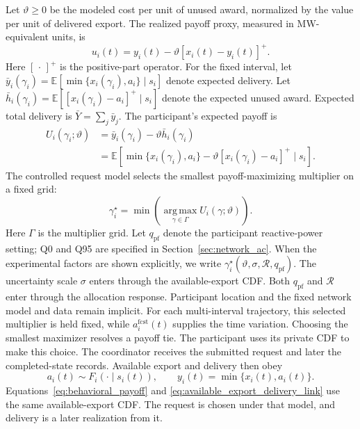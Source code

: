 \documentclass[twoside,twocolumn,9pt]{article}
\begin{document}
{Let $\vartheta\ge0$ be the modeled cost per unit of unused award, normalized by
the value per unit of delivered export. The realized payoff proxy, measured in
MW-equivalent units, is
\begin{equation}
u_i(t)=y_i(t)-\vartheta[x_i(t)-y_i(t)]^+.
\label{eq:realized_private_payoff}
\end{equation}
Here $[\,\cdot\,]^+$ is the positive-part operator. For the fixed interval, let
$\bar y_i(\gamma_i)=\mathbb E[\min\{x_i(\gamma_i),a_i\}\mid s_i]$ denote
expected delivery. Let
$\bar h_i(\gamma_i)=\mathbb E[[x_i(\gamma_i)-a_i]^+\mid s_i]$ denote the expected
unused award. Expected total delivery is $\bar Y=\sum_j\bar y_j$. The
participant's expected payoff is
\begin{equation}
\begin{aligned}
U_i(\gamma_i;\vartheta)
&=\bar y_i(\gamma_i)-\vartheta\bar h_i(\gamma_i)\\
&=\mathbb E\!\left[
\min\{x_i(\gamma_i),a_i\}
-\vartheta[x_i(\gamma_i)-a_i]^+
\mid s_i\right].
\end{aligned}
\label{eq:behavioral_payoff}
\end{equation}
The controlled request model selects the smallest payoff-maximizing multiplier
on a fixed grid:
\begin{equation}
\gamma_i^\star
=\min\!\left(
\operatorname*{arg\,max}_{\gamma\in\Gamma}U_i(\gamma;\vartheta)
\right).
\label{eq:endogenous_best_response}
\end{equation}
Here $\Gamma$ is the multiplier grid. Let $q_{\mathrm{pf}}$ denote the
participant reactive-power setting; Q0 and Q95 are specified in
Section~\ref{sec:network_ac}. When the experimental factors are shown
explicitly, we write
$\gamma_i^\star(\vartheta,\sigma,\mathcal R,q_{\mathrm{pf}})$. The uncertainty
scale $\sigma$ enters through the available-export CDF. Both
$q_{\mathrm{pf}}$ and $\mathcal R$ enter through the allocation response.
Participant location and the fixed network model and data remain implicit. For
each multi-interval trajectory, this selected multiplier is held fixed, while
$a_i^{\mathrm{fcst}}(t)$ supplies the time variation. Choosing the smallest
maximizer resolves a payoff tie. The
participant uses its private CDF to make this choice. The coordinator receives
the submitted request and later the completed-state records. Available export
and delivery then obey
\begin{equation}
a_i(t)\sim F_i(\cdot\mid s_i(t)),
\qquad
y_i(t)=\min\{x_i(t),a_i(t)\}.
\label{eq:available_export_delivery_link}
\end{equation}
Equations~\eqref{eq:behavioral_payoff} and
\eqref{eq:available_export_delivery_link} use the same available-export CDF. The
request is chosen under that model, and delivery is a later realization from it.

}
\end{document}
